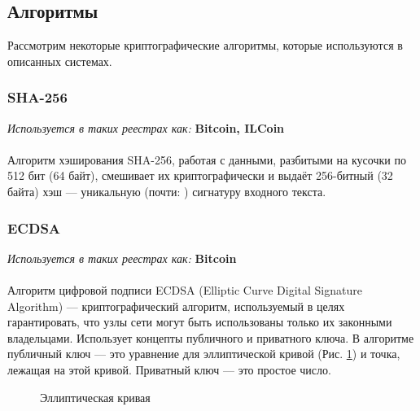 \subsection{Алгоритмы}
Рассмотрим некоторые криптографические алгоритмы, которые используются в описанных системах.
\subsubsection{SHA-256}
\emph{Используется в таких реестрах как: } \textbf{Bitcoin, ILCoin}\\\\
Алгоритм хэширования SHA-256, работая с данными, разбитыми на кусочки по 512
бит (64 байт), смешивает их криптографически и выдаёт 256-битный (32 байта) хэш
--- уникальную (почти: \cite{Jim2012}) сигнатуру входного текста.
\subsubsection{ECDSA}
\emph{Используется в таких реестрах как:} \textbf{Bitcoin} \\\\
Алгоритм цифровой подписи ECDSA (Elliptic Curve Digital Signature Algorithm)
--- криптографический алгоритм, используемый в целях гарантировать, что узлы
сети могут быть использованы только их законными владельцами. Использует
концепты публичного и приватного ключа. В алгоритме публичный ключ --- это
уравнение для эллиптической кривой (Рис. \ref{elliptic_curve}) и точка, лежащая
на этой кривой. Приватный ключ --- это простое число.

\begin{figure}[h]
    \centering
    \caption{Эллиптическая кривая}\label{elliptic_curve}
\end{figure}

